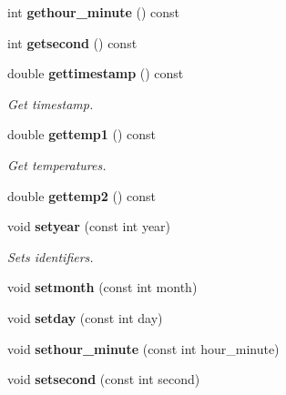 \begin{DoxyCompactItemize}
\item 
int {\bfseries gethour\_\-minute} () const \label{classCALICE_1_1ScECALTemperature_a1bb03c5bd358d4f5262e3a03f366cb66}

\item 
int {\bfseries getsecond} () const \label{classCALICE_1_1ScECALTemperature_a8c8412de6fc78542dd5f0a2476a29a06}

\item 
double {\bf gettimestamp} () const \label{classCALICE_1_1ScECALTemperature_ab3ef29a9e1200f3a5dfc1e6b225f1dfc}

\begin{DoxyCompactList}\small\item\em Get timestamp. \item\end{DoxyCompactList}\item 
double {\bf gettemp1} () const \label{classCALICE_1_1ScECALTemperature_a6dd7af50cc894061f0e50d36d812b940}

\begin{DoxyCompactList}\small\item\em Get temperatures. \item\end{DoxyCompactList}\item 
double {\bfseries gettemp2} () const \label{classCALICE_1_1ScECALTemperature_a82a592bc57f805615cd4176bd7cdb06e}

\item 
void {\bf setyear} (const int year)\label{classCALICE_1_1ScECALTemperature_ad5f653b16b28db8b389184d9fc0de712}

\begin{DoxyCompactList}\small\item\em Sets identifiers. \item\end{DoxyCompactList}\item 
void {\bfseries setmonth} (const int month)\label{classCALICE_1_1ScECALTemperature_a127fa120ab01339922da6214dec09fc2}

\item 
void {\bfseries setday} (const int day)\label{classCALICE_1_1ScECALTemperature_a421550046b4bff4d6ba3715a515f3889}

\item 
void {\bfseries sethour\_\-minute} (const int hour\_\-minute)\label{classCALICE_1_1ScECALTemperature_abbb5a0a11a0d5d2e21f20759132991ed}

\item 
void {\bfseries setsecond} (const int second)\label{classCALICE_1_1ScECALTemperature_a5d6d0e550c855be85780be82eecb74ec}


\end{DoxyCompactItemize}
